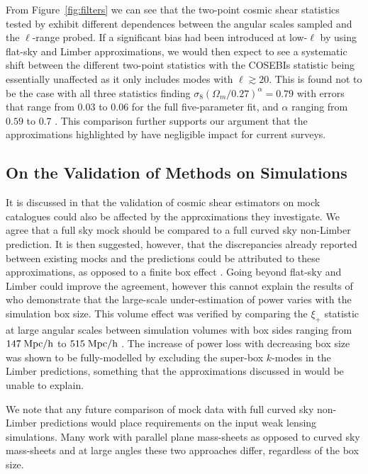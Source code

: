 From Figure~\ref{fig:filters} we can see that the two-point cosmic shear statistics tested by \citet{kilbinger/etal:2013} exhibit different dependences between the angular scales sampled and the $\ell$-range probed.   
If a significant bias had been introduced at low-$\ell$ by using flat-sky and Limber approximations, we would then expect to see a systematic shift between the different two-point statistics with the COSEBIs statistic being essentially unaffected as it only includes modes with $\ell \gtrsim 20$.  This is found not to be the case with all three statistics finding $\sigma_8 (\Omega_m/0.27)^\alpha = 0.79$ with errors that range from $0.03$ to $0.06$ for the full five-parameter fit, and $\alpha$ ranging from $0.59$ to 0.7 \citep[see Table 5 of][]{kilbinger/etal:2013}.  This comparison further supports our argument that the approximations highlighted by \citet{kitching/etal:2016} have negligible impact for current surveys.


\subsection{On the Validation of Methods on Simulations}
It is discussed in \citet{kitching/etal:2016} that the validation of cosmic shear estimators on mock catalogues could also be affected by the approximations they investigate.  We agree that a full sky mock should be compared to a full curved sky non-Limber prediction.  It is then suggested, however, that the discrepancies already reported between existing mocks and the predictions could be attributed to these approximations, as opposed to a finite box effect \citep{kiessling/etal:2011, harnois-deraps/etal:2012, harnois-deraps/vanwaerbeke:2015}.  Going beyond flat-sky and Limber could improve the agreement, however this cannot explain the results of \citet{harnois-deraps/vanwaerbeke:2015} who demonstrate that the large-scale under-estimation of power varies with the simulation box size. This volume effect was verified by comparing the $\xi_+$ statistic at large angular scales between simulation volumes with box sides  ranging from $147\;\rm{Mpc/h}$ to $515\;\rm{Mpc/h}$ \citep[see Fig. 5 in][]{harnois-deraps/vanwaerbeke:2015}. The increase of power loss with decreasing box size was shown to be fully-modelled by excluding the super-box $k$-modes in the Limber predictions, something that the approximations discussed in \citet{kitching/etal:2016} would be unable to explain.

We note that any future comparison of mock data with full curved sky non-Limber predictions would place requirements on the input weak lensing simulations.  Many work with parallel plane mass-sheets as opposed to curved sky mass-sheets and at large angles these two approaches differ, regardless of the box size. 


